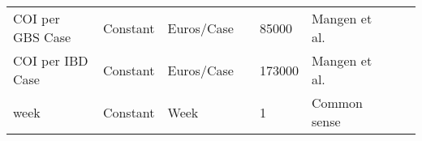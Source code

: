 \begin{landscape}
\begin{longtable}[c]{m{10em}lllm{15em}lll}
COI per GBS Case                              & Constant & Euros/Case               &                           & 85000                                                                                                                                                                                                                                                                                    & Mangen et al.                                                                                                                                                                                &                                                                                                                                                                                                                                       \\
COI per IBD Case                              & Constant & Euros/Case               &                           & 173000                                                                                                                                                                                                                                                                                   & Mangen et al.                                                                                                                                                                                &                                                                                                                                                                                                                                       \\
week                                          & Constant & Week                     &                           & 1                                                                                                                                                                                                                                                                                        & Common sense                                                                                                                                                                                 &                                                                                                                                                                                                                                       \\

\end{longtable}
\end{landscape}
